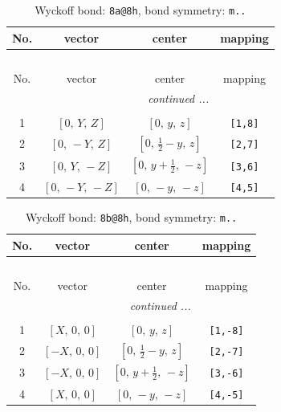 \documentclass[fleqn,8pt]{jsarticle}
\begin{document}
\begin{longtable}{cccc}
\caption{Wyckoff bond: {\tt 8a@8h}, bond symmetry: {\tt m..}}
 \\
 \hline \hline
No. & vector & center & mapping \\ \hline \endfirsthead

\multicolumn{3}{l}{\tablename\ \thetable{}} \\
 \hline \hline
No. & vector & center & mapping \\ \hline \endhead

 \hline \hline
\multicolumn{3}{r}{\footnotesize\it continued ...} \\ \endfoot

 \hline \hline
\multicolumn{3}{r}{} \\ \endlastfoot

1 & $\left[ 0,\, Y,\, Z \right]$ & $\left[ 0,\, y,\, z \right]$ & {\tt [1,8]} \\ \hline
2 & $\left[ 0,\, - Y,\, Z \right]$ & $\left[ 0,\, \frac{1}{2} - y,\, z \right]$ & {\tt [2,7]} \\ \hline
3 & $\left[ 0,\, Y,\, - Z \right]$ & $\left[ 0,\, y + \frac{1}{2},\, - z \right]$ & {\tt [3,6]} \\ \hline
4 & $\left[ 0,\, - Y,\, - Z \right]$ & $\left[ 0,\, - y,\, - z \right]$ & {\tt [4,5]} \\
\end{longtable}
\renewcommand{\arraystretch}{1.2}
\begin{longtable}{cccc}
\caption{Wyckoff bond: {\tt 8b@8h}, bond symmetry: {\tt m..}}
 \\
 \hline \hline
No. & vector & center & mapping \\ \hline \endfirsthead

\multicolumn{3}{l}{\tablename\ \thetable{}} \\
 \hline \hline
No. & vector & center & mapping \\ \hline \endhead

 \hline \hline
\multicolumn{3}{r}{\footnotesize\it continued ...} \\ \endfoot

 \hline \hline
\multicolumn{3}{r}{} \\ \endlastfoot

1 & $\left[ X,\, 0,\, 0 \right]$ & $\left[ 0,\, y,\, z \right]$ & {\tt [1,-8]} \\ \hline
2 & $\left[ - X,\, 0,\, 0 \right]$ & $\left[ 0,\, \frac{1}{2} - y,\, z \right]$ & {\tt [2,-7]} \\ \hline
3 & $\left[ - X,\, 0,\, 0 \right]$ & $\left[ 0,\, y + \frac{1}{2},\, - z \right]$ & {\tt [3,-6]} \\ \hline
4 & $\left[ X,\, 0,\, 0 \right]$ & $\left[ 0,\, - y,\, - z \right]$ & {\tt [4,-5]} \\
\end{longtable}
\end{document}
